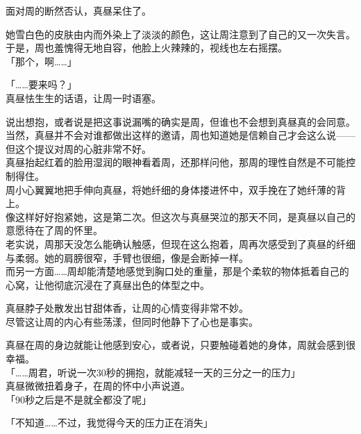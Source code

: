 面对周的断然否认，真昼呆住了。

她雪白色的皮肤由内而外染上了淡淡的颜色，这让周注意到了自己的又一次失言。\\

于是，周也羞愧得无地自容，他脸上火辣辣的，视线也左右摇摆。\\

「那个，啊……」

「……要来吗？」\\

真昼怯生生的话语，让周一时语塞。

说出想抱，或者说是把这事说漏嘴的确实是周，但谁也不会想到真昼真的会同意。\\

当然，真昼并不会对谁都做出这样的邀请，周也知道她是信赖自己才会这么说——但这个提议对周的心脏非常不好。\\

真昼抬起红着的脸用湿润的眼神看着周，还那样问他，那周的理性自然是不可能控制得住。\\

周小心翼翼地把手伸向真昼，将她纤细的身体搂进怀中，双手挽在了她纤薄的背上。\\

像这样好好抱紧她，这是第二次。但这次与真昼哭泣的那天不同，是真昼以自己的意愿待在了周的怀里。\\

老实说，周那天没怎么能确认触感，但现在这么抱着，周再次感受到了真昼的纤细与柔弱。她的肩膀很窄，手臂也很细，像是会断掉一样。\\

而另一方面……周却能清楚地感觉到胸口处的重量，那是个柔软的物体抵着自己的心窝，让他彻底沉浸在了真昼出色的体型之中。

真昼脖子处散发出甘甜体香，让周的心情变得非常不妙。\\

尽管这让周的内心有些荡漾，但同时他静下了心也是事实。

真昼在周的身边就能让他感到安心，或者说，只要触碰着她的身体，周就会感到很幸福。\\

「……周君，听说一次30秒的拥抱，就能减轻一天的三分之一的压力」\\

真昼微微扭着身子，在周的怀中小声说道。\\

「90秒之后是不是就全都没了呢」

「不知道……不过，我觉得今天的压力正在消失」


